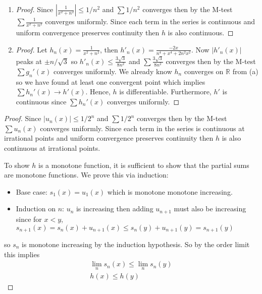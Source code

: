\begin{enumerate}[label=(\alph*)]
    \item 
    \begin{proof}
        Since $|\frac{1}{x^2+n^2}|\leq 1/n^2$ and $\sum  1/n^2$
        converges then by the M-test $\sum \frac{1}{x^2+n^2}$ converges 
        uniformly. Since each term in the series is continuous and 
        uniform convergence preserves continuity then $h$ is also 
        continuous.
    \end{proof}

    \item
    \begin{proof}
        Let $h_n(x) = \frac{1}{x^2+n^2}$, then $h'_n(x) =\frac{-2x}{n^4+x^4+2n^2x^2}$.
        Now $|h'_n(x)|$ peaks at $\pm n/ \sqrt 3$ so $h'_n(x)\leq \frac{3\sqrt 3}{8n^2}$
         and $\sum \frac{3\sqrt 3}{8n^2}$
        converges then by the M-test $\sum g_n'(x)$ converges 
        uniformly. We already know $h_n$ converges on $\mathbb{R}$ from (a)
        so we have found at least one convergent point which implies
        $\sum h_n'(x) \rightarrow h'(x)$. Hence, $h$ is differentiable.
        Furthermore, $h'$ is continuous since $\sum h_n'(x)$ converges 
        uniformly.
    \end{proof}
\end{enumerate}

\begin{proof}
    Since $|u_n(x)|\leq 1/2^n$ and $\sum  1/2^n$
    converges then by the M-test $\sum u_n(x)$ converges 
    uniformly. Since each term in the series is continuous at irrational points
     and uniform convergence preserves continuity then $h$ is also 
    continuous at irrational points.

    To show $h$ is a monotone function, 
    it is sufficient to show that the partial sums are monotone functions.
    We prove this via induction:
    \begin{itemize}
        \item Base case: $s_1(x) = u_1(x)$ which is monotone monotone increasing.
        \item Induction on $n$: $u_n$ is increasing then adding $u_{n+1}$ must 
        also be increasing since for $x<y$, $s_{n+1}(x) = s_{n}(x)+u_{n+1}(x) 
        \leq s_{n}(y)+u_{n+1}(y) = s_{n+1}(y)$
    \end{itemize}
    so $s_n$ is monotone increasing by the induction hypothesis.
    So by the order limit \Thm this implies 
    \begin{gather*}
        \lim_n s_n(x) \leq \lim_n s_n(y) \\
        h(x) \leq h(y)
    \end{gather*}
\end{proof}